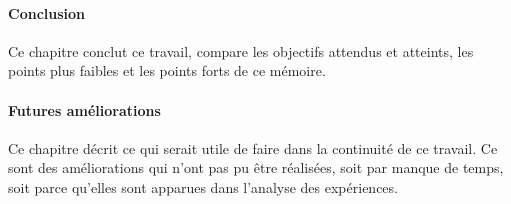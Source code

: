 \paragraph{Conclusion}
Ce chapitre conclut ce travail, compare les objectifs attendus et atteints, les points plus faibles et les points forts de ce mémoire. %

\paragraph{Futures améliorations}
Ce chapitre décrit ce qui serait utile de faire dans la continuité de ce travail. Ce sont des améliorations qui n'ont pas pu être réalisées, soit par manque de temps, soit parce qu'elles sont apparues dans l'analyse des expériences.
